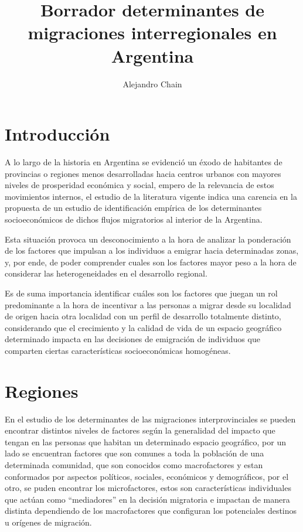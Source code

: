 \documentclass[12pt,a4paper]{article}
\author{Alejandro Chain}
\title{Borrador determinantes de migraciones interregionales en Argentina}
\begin{document}
\maketitle
\newpage
\tableofcontents
\newpage
\section{Introducción}
A lo largo de la historia en Argentina se evidenció un éxodo de habitantes de provincias o
regiones menos desarrolladas hacia centros urbanos con mayores niveles de prosperidad económica y social, empero de la relevancia de estos movimientos internos, el estudio de la literatura vigente indica una carencia en la propuesta de un estudio de identificación empírica de los determinantes socioeconómicos de dichos flujos migratorios al interior de la Argentina.

Esta situación provoca un desconocimiento a la hora de analizar la ponderación de los factores que impulsan a los individuos a emigrar hacia determinadas zonas, y, por ende, de poder comprender cuales son los factores mayor peso a la hora de considerar las heterogeneidades en el desarrollo regional.

Es de suma importancia identificar cuáles son los factores que juegan un rol predominante a la hora de incentivar a las personas a migrar desde su localidad de origen hacia otra localidad con un perfil de desarrollo totalmente distinto,  considerando que el crecimiento y la calidad de vida de un espacio geográfico determinado impacta en las decisiones de emigración de individuos que comparten ciertas características socioeconómicas homogéneas.

\section{Regiones}
En el estudio de los determinantes de las migraciones interprovinciales se pueden encontrar distintos niveles de factores según la generalidad del impacto que tengan en las personas que habitan un determinado espacio geográfico, por un lado se encuentran factores que son comunes a toda la población de una determinada comunidad, que son conocidos como macrofactores y estan conformados por aspectos políticos, sociales, económicos y demográficos, por el otro, se puden encontrar los microfactores, estos son características individuales que actúan como “mediadores” en la decisión migratoria e impactan de manera distinta dependiendo de los macrofactores que configuran los potenciales destinos u orígenes de migración.
\end{document}

